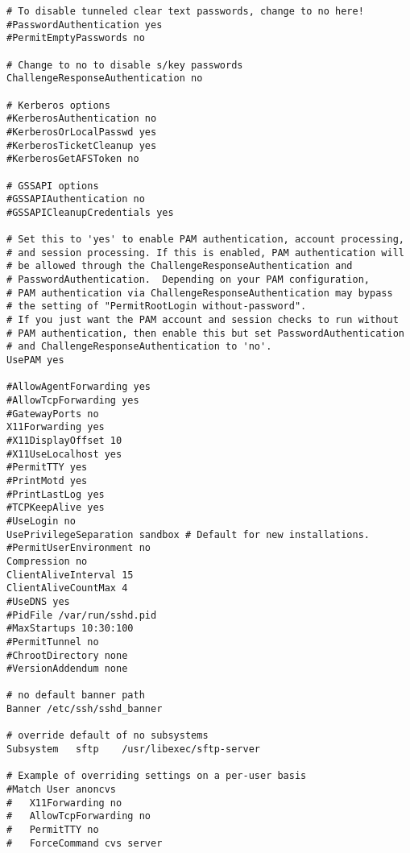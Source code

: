 \begin{verbatim}
# To disable tunneled clear text passwords, change to no here!
#PasswordAuthentication yes
#PermitEmptyPasswords no

# Change to no to disable s/key passwords
ChallengeResponseAuthentication no

# Kerberos options
#KerberosAuthentication no
#KerberosOrLocalPasswd yes
#KerberosTicketCleanup yes
#KerberosGetAFSToken no

# GSSAPI options
#GSSAPIAuthentication no
#GSSAPICleanupCredentials yes

# Set this to 'yes' to enable PAM authentication, account processing,
# and session processing. If this is enabled, PAM authentication will
# be allowed through the ChallengeResponseAuthentication and
# PasswordAuthentication.  Depending on your PAM configuration,
# PAM authentication via ChallengeResponseAuthentication may bypass
# the setting of "PermitRootLogin without-password".
# If you just want the PAM account and session checks to run without
# PAM authentication, then enable this but set PasswordAuthentication
# and ChallengeResponseAuthentication to 'no'.
UsePAM yes

#AllowAgentForwarding yes
#AllowTcpForwarding yes
#GatewayPorts no
X11Forwarding yes
#X11DisplayOffset 10
#X11UseLocalhost yes
#PermitTTY yes
#PrintMotd yes
#PrintLastLog yes
#TCPKeepAlive yes
#UseLogin no
UsePrivilegeSeparation sandbox # Default for new installations.
#PermitUserEnvironment no
Compression no
ClientAliveInterval 15
ClientAliveCountMax 4
#UseDNS yes
#PidFile /var/run/sshd.pid
#MaxStartups 10:30:100
#PermitTunnel no
#ChrootDirectory none
#VersionAddendum none

# no default banner path
Banner /etc/ssh/sshd_banner

# override default of no subsystems
Subsystem	sftp	/usr/libexec/sftp-server

# Example of overriding settings on a per-user basis
#Match User anoncvs
#	X11Forwarding no
#	AllowTcpForwarding no
#	PermitTTY no
#	ForceCommand cvs server
\end{verbatim}

